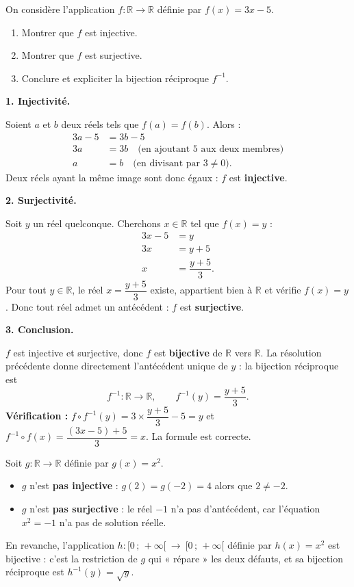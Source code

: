 \documentclass[11pt]{article}
\begin{document}
\begin{exoresolu}
On considère l'application $f:\mathbb{R}\to\mathbb{R}$ définie par $f(x)=3x-5$.
\begin{enumerate}
\item Montrer que $f$ est injective.
\item Montrer que $f$ est surjective.
\item Conclure et expliciter la bijection réciproque $f^{-1}$.
\end{enumerate}
\tcblower
\textbf{1. Injectivité.}

Soient $a$ et $b$ deux réels tels que $f(a)=f(b)$. Alors :
\begin{align*}
3a-5 &= 3b-5\\
3a &= 3b \quad \text{(en ajoutant } 5 \text{ aux deux membres)}\\
a &= b \quad \text{(en divisant par } 3\neq 0\text{)}.
\end{align*}
Deux réels ayant la même image sont donc égaux : $f$ est \textbf{injective}.

\textbf{2. Surjectivité.}

Soit $y$ un réel quelconque. Cherchons $x\in\mathbb{R}$ tel que $f(x)=y$ :
\begin{align*}
3x-5 &= y\\
3x &= y+5\\
x &= \dfrac{y+5}{3}.
\end{align*}
Pour tout $y\in\mathbb{R}$, le réel $x=\dfrac{y+5}{3}$ existe, appartient bien à $\mathbb{R}$ et vérifie $f(x)=y$. Donc tout réel admet un antécédent : $f$ est \textbf{surjective}.

\textbf{3. Conclusion.}

$f$ est injective et surjective, donc $f$ est \textbf{bijective} de $\mathbb{R}$ vers $\mathbb{R}$. La résolution précédente donne directement l'antécédent unique de $y$ : la bijection réciproque est
\[f^{-1}:\mathbb{R}\to\mathbb{R},\qquad f^{-1}(y)=\dfrac{y+5}{3}.\]
\textbf{Vérification :} $f\circ f^{-1}(y)=3\times\dfrac{y+5}{3}-5=y$ et $f^{-1}\circ f(x)=\dfrac{(3x-5)+5}{3}=x$. La formule est correcte.
\end{exoresolu}

\begin{exemplebox}
Soit $g:\mathbb{R}\to\mathbb{R}$ définie par $g(x)=x^2$.
\begin{itemize}
\item $g$ n'est \textbf{pas injective} : $g(2)=g(-2)=4$ alors que $2\neq -2$.
\item $g$ n'est \textbf{pas surjective} : le réel $-1$ n'a pas d'antécédent, car l'équation $x^2=-1$ n'a pas de solution réelle.
\end{itemize}
En revanche, l'application $h:[0\,;\,+\infty[\ \to\ [0\,;\,+\infty[$ définie par $h(x)=x^2$ est bijective : c'est la restriction de $g$ qui « répare » les deux défauts, et sa bijection réciproque est $h^{-1}(y)=\sqrt{y}$.
\end{exemplebox}
\end{document}
